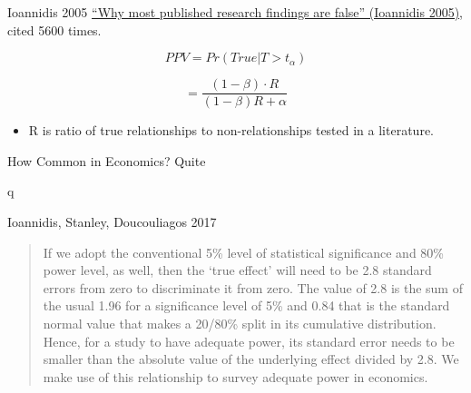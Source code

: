 \documentclass{beamer}
\begin{document}
\begin{frame}[label=Ioannidis]{Ioannidis 2005}
\href{http://journals.plos.org/plosmedicine/article?id=10.1371/journal.pmed.0020124}{``Why most published research findings are false'' (Ioannidis 2005)}, cited 5600 times.

\[PPV = Pr(True|T > t_{\alpha})\]


\[= \frac{(1 - \beta) \cdot R}{(1 - \beta)R + \alpha}\]

\begin{itemize}
\item
  R is ratio of true relationships to non-relationships tested in a literature.
\end{itemize}

\hyperlink{derive}{}
\end{frame}

\begin{frame}{How Common in Economics?}
Quite
\end{frame}

{ %
    \begin{frame}[plain]q
     \end{frame}
}

\begin{frame}{Ioannidis, Stanley, Doucouliagos 2017}
\begin{quote}If we adopt the conventional 5\% level of statistical significance and 80\% power
level, as well, then the `true effect' will need to be 2.8 standard errors from zero to
discriminate it from zero. The value of 2.8 is the sum of the usual 1.96 for a
significance level of 5\% and 0.84 that is the standard normal value that makes a 20/80\% split in its cumulative distribution. Hence, for a study to have adequate power, its
standard error needs to be smaller than the absolute value of the underlying effect
divided by 2.8. We make use of this relationship to survey adequate power in
economics.
\end{quote}
\end{frame}
\end{document}
